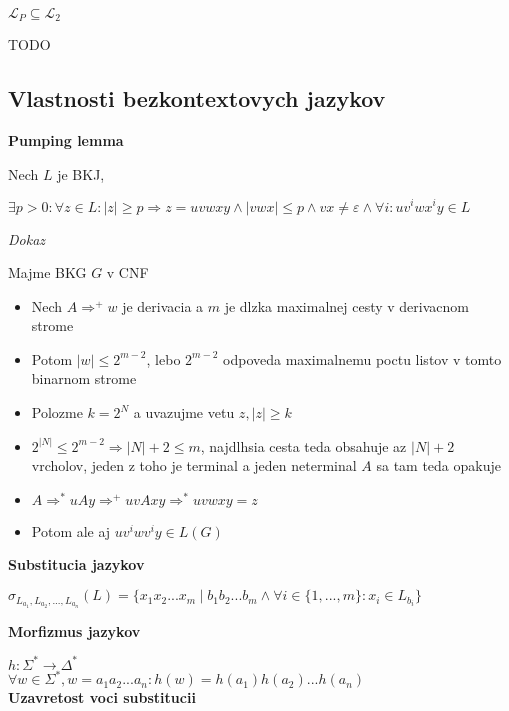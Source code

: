 \documentclass[12pt]{article}
\newcommand{\pipesep}{\hspace{3pt} \vert \hspace{3pt}}
\begin{document}
$\mathcal{L}_{P} \subseteq \mathcal{L}_{2}$

TODO

\subsection*{Vlastnosti bezkontextovych jazykov}

\textbf{Pumping lemma}

Nech $L$ je BKJ,

$\exists p > 0: \forall z \in L: |z| \ge p \Rightarrow z = uvwxy \land |vwx| \le p \land vx \not= \varepsilon \land \forall i: uv^{i}wx^{i}y \in L$

\emph{Dokaz}

Majme BKG $G$ v CNF
\begin{itemize}
	\item Nech $A \Rightarrow^{+} w$ je derivacia a $m$ je dlzka maximalnej cesty v derivacnom strome
	\item Potom $|w| \le 2^{m-2}$, lebo $2^{m-2}$ odpoveda maximalnemu poctu listov v tomto binarnom strome
	\item Polozme $k = 2^{N}$ a uvazujme vetu $z, |z| \ge k$
	\item $2^{|N|} \le 2^{m-2} \Rightarrow |N| + 2 \le m$, najdlhsia cesta teda obsahuje az $|N| + 2$ vrcholov,
		jeden z toho je terminal a jeden neterminal $A$ sa tam teda opakuje
	\item $A \Rightarrow^{*} uAy \Rightarrow^{+} uvAxy \Rightarrow^{*} uvwxy = z$
	\item Potom ale aj $uv^{i}wv^{i}y \in L(G)$
\end{itemize}

\textbf{Substitucia jazykov}

$\sigma_{L_{a_{1}},L_{a_{2}},...,L_{a_{n}}}(L) = \{x_{1}x_{2}...x_{m} \pipesep b_{1}b_{2}...b_{m} \land \forall i \in \{1,...,m\}: x_{i} \in L_{b_{i}}\}$

\textbf{Morfizmus jazykov}

$h: \Sigma^{*} \to \Delta^{*}$\\
$\forall w \in \Sigma^{*}, w = a_{1}a_{2}...a_{n} : h(w) = h(a_{1})h(a_{2})...h(a_{n})$\\

\textbf{Uzavretost voci substitucii}
\end{document}
